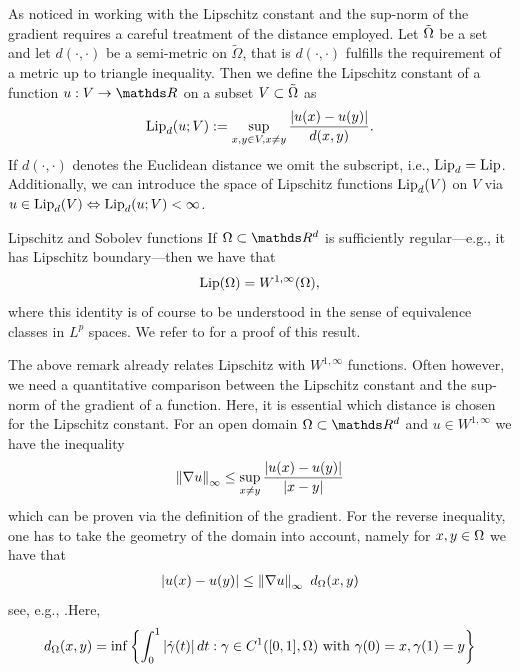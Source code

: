 As noticed in \cite{jensen1993uniqueness} working with the Lipschitz constant and the sup-norm of the gradient requires a careful 
treatment of the distance employed. Let $\tilde{\Omega}$ be a set and let $d(\cdot,\cdot)$ be a semi-metric on $\tilde\Omega$, that is $d(\cdot,\cdot)$ fulfills 
the requirement of a metric up to triangle inequality. Then we define the Lipschitz constant of a function $u:V\to \R$ on a subset $V\subset \tilde{\Omega}$ as
%
\begin{align*}
\operatorname{Lip}_d(u; V):= \sup_{x,y\in V, x\neq y} \frac{\left|u(x) - u(y)\right|}{d(x,y)}.
\end{align*}
%
If $d(\cdot,\cdot)$ denotes the Euclidean distance we omit the subscript, i.e., $\operatorname{Lip}_d = \operatorname{Lip}$. Additionally, we can 
introduce the space of Lipschitz functions $\operatorname{Lip}_d(V)$ on $V$ via 
$u\in \operatorname{Lip}_d(V) \Leftrightarrow \operatorname{Lip}_d(u;V) <\infty$.
%
\begin{remark}{Lipschitz and Sobolev functions}{}
If $\domain\subset\R^d$ is sufficiently regular---e.g., it has Lipschitz boundary---then we have that
%
\begin{align*}
\operatorname{Lip}(\Omega) = W^{1,\infty}(\Omega),
\end{align*}
%
where this identity is of course to be understood in the sense of equivalence classes in $L^p$ spaces. We refer to \cite{evans2018measure} for a proof of this result.
\end{remark}
%
The above remark already relates Lipschitz with $W^{1,\infty}$ functions. Often however, we need a quantitative 
comparison between the Lipschitz constant and the sup-norm of the gradient of a function. Here, it is essential 
which distance is chosen for the Lipschitz constant. For an open domain $\domain\subset\R^d$ and $u\in W^{1,\infty}$ we have the inequality
%
\begin{align*}
\left\|\nabla u\right\|_\infty \leq \sup_{x\neq y} \frac{\left|u(x) - u(y)\right|}{\left|x-y\right|}
\end{align*}
%
which can be proven via the definition of the gradient. For the reverse inequality, one has to take the geometry of the domain into account, namely for $x,y\in\Omega$ we have that
%
\begin{align}\label{eq:LipGrad}
\left|u(x) - u(y)\right| \leq \left\|\nabla u\right\|_\infty\ d_\Omega(x,y)
\end{align}
%
see, e.g., \cite[Prop9.3, Rem. 7]{brezis2011functional}.Here,
%
\begin{align*}
d_\Omega(x,y) = \inf \left\{
\int_0^1 \left|\dot{\gamma}(t)\right| dt : \gamma\in C^1([0,1], \Omega)\text{ with } \gamma(0)=x, \gamma(1) =y
\right\}
\end{align*}
